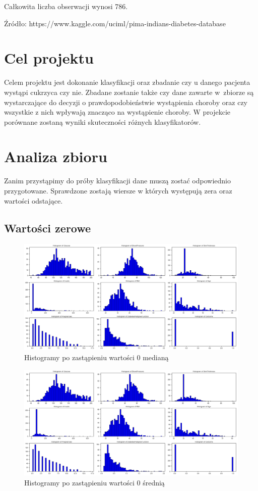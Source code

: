 \documentclass[12pt]{article}
\begin{document}
Całkowita liczba obserwacji wynosi 786.

Źródło: https://www.kaggle.com/uciml/pima-indians-diabetes-database


\pagebreak
\section{Cel projektu}

Celem projektu jest dokonanie klasyfikacji oraz zbadanie czy u danego pacjenta wystąpi cukrzyca czy nie. Zbadane zostanie także czy dane zawarte w~zbiorze są wystarczające do decyzji o prawdopodobieństwie wystąpienia choroby oraz czy wszystkie z nich wpływają znacząco na wystąpienie choroby.
W projekcie porównane zostaną wyniki skuteczności różnych klasyfikatorów.

\section{Analiza zbioru}

Zanim przystąpimy do próby klasyfikacji dane muszą zostać odpowiednio przygotowane. Sprawdzone zostają wiersze w których występują zera oraz wartości odstające.

\subsection{Wartości zerowe}

\begin{figure}
	\centering
	\includegraphics[width=1.2\textwidth]{images/hist_median.png}
	\caption{Histogramy po zastąpieniu wartości 0 medianą}
	\label{fig:outliers}
\end{figure}

\begin{figure}
	\centering
	\includegraphics[width=1.2\textwidth]{images/hist_average.png}
	\caption{Histogramy po zastąpieniu wartości 0 średnią}
	\label{fig:outliers}
\end{figure}
\end{document}
